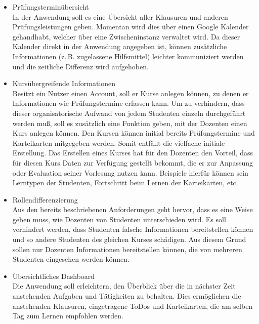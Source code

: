 \begin{itemize}
    \item Prüfungsterminübersicht           \\
        In der Anwendung soll es eine Übersicht aller Klausuren und anderen Prüfungsleistungen geben.
        Momentan wird dies über einen Google Kalender gehandhabt, welcher über eine Zwischeninstanz verwaltet wird.
        Da dieser Kalender direkt in der Anwendung angegeben ist, können zusätzliche Informationen (z.\,B. zugelassene Hilfsmittel) leichter kommuniziert werden und die zeitliche Differenz wird aufgehoben.

    \item Kursübergreifende Informationen   \\
        Besitzt ein Nutzer einen Account, soll er Kurse anlegen können, zu denen er Informationen wie  Prüfungstermine erfassen kann.
        Um zu verhindern, dass dieser organisatorische Aufwand von jedem Studenten einzeln durchgeführt werden muß, soll es zusätzlich eine Funktion geben, mit der Dozenten einen Kurs anlegen können.
        Den Kursen können initial bereits Prüfungstermine und Karteikarten mitgegeben werden.
        Somit entfällt die vielfache initiale Erstellung.
        Das Erstellen eines Kurses hat für den Dozenten den Vorteil, dass für diesen Kurs Daten zur Verfügung gestellt bekommt, die er zur Anpassung oder Evaluation seiner Vorlesung nutzen kann.
        Beispiele hierfür können sein Lerntypen der Studenten, Fortschritt beim Lernen der Karteikarten, etc.
    \item Rollendifferenzierung             \\
        Aus den bereits beschriebenen Anforderungen geht hervor, dass es eine Weise geben muss, wie Dozenten von Studenten unterschieden wird.
        Es soll verhindert werden, dass Studenten falsche Informationen bereitstellen können und so andere Studenten des gleichen Kurses schädigen.
        Aus diesem Grund sollen nur Dozenten Informationen bereitstellen können, die von mehreren Studenten eingesehen werden können.
    \item Übersichtliches Dashboard			\\
   		Die Anwendung soll erleichtern, den Überblick über die in nächster Zeit anstehenden Aufgaben und Tätigkeiten zu behalten. Dies ermöglichen die anstehenden Klausuren, eingetragene ToDos und Karteikarten, die am selben Tag zum Lernen empfohlen werden.
  
\end{itemize}



